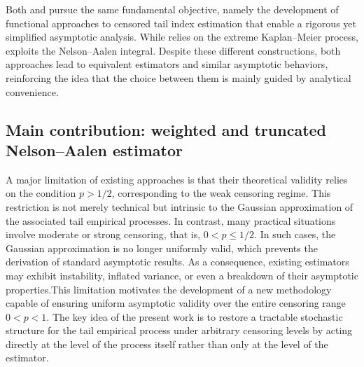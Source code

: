 \documentclass[reqno,openbib,runningheads,a4paper,12pt]{amsart}%
\begin{document}
\noindent Both \cite{BR2025} and \cite{MNS2025} pursue the same fundamental
objective, namely the development of functional approaches to censored tail
index estimation that enable a rigorous yet simplified asymptotic analysis.
While \cite{BR2025} relies on the extreme Kaplan--Meier process,
\cite{MNS2025} exploits the Nelson--Aalen integral. Despite these different
constructions, both approaches lead to equivalent estimators and similar
asymptotic behaviors, reinforcing the idea that the choice between them is
mainly guided by analytical convenience.

\subsection{\textbf{Main contribution: weighted and truncated Nelson--Aalen
estimator}}

\noindent A major limitation of existing approaches is that their theoretical
validity relies on the condition $p>1/2$, corresponding to the weak censoring
regime. This restriction is not merely technical but intrinsic to the Gaussian
approximation of the associated tail empirical processes. In contrast, many
practical situations involve moderate or strong censoring, that is,
$0<p\leq1/2$. In such cases, the Gaussian approximation is no longer uniformly
valid, which prevents the derivation of standard asymptotic results. As a
consequence, existing estimators may exhibit instability, inflated variance,
or even a breakdown of their asymptotic properties.\smallskip\noindent This
limitation motivates the development of a new methodology capable of ensuring
uniform asymptotic validity over the entire censoring range $0<p<1$. The key
idea of the present work is to restore a tractable stochastic structure for
the tail empirical process under arbitrary censoring levels by acting directly
at the level of the process itself rather than only at the level of the
estimator.\smallskip
\end{document}
